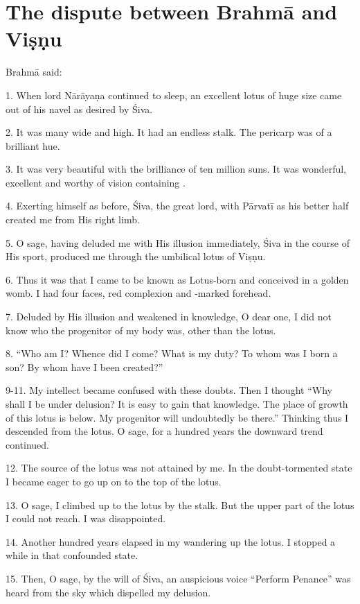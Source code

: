 \chapter{The dispute between Brahmā and Viṣṇu}

Brahmā said:

1. When lord Nārāyaṇa continued to sleep, an excellent lotus of huge size came
out of his navel as desired by Śiva.

2. It was many  wide and high. It had an endless stalk. The pericarp
was of a brilliant hue.

3. It was very beautiful with the brilliance of ten million suns. It was
wonderful, excellent and worthy of vision containing .

4. Exerting himself as before, Śiva, the great lord, with Pārvatī as his better
half created me from His right limb.

5. O sage, having deluded me with His illusion immediately, Śiva in the course
of His sport, produced me through the umbilical lotus of Viṣṇu.

6. Thus it was that I came to be known as Lotus-born and conceived in a golden
womb. I had four faces, red complexion and -marked forehead.

7. Deluded by His illusion and weakened in knowledge, O dear one, I did not know
who the progenitor of my body was, other than the lotus.

8. “Who am I? Whence did I come? What is my duty? To whom was I born a son? By
whom have I been created?”

9-11. My intellect became confused with these doubts. Then I thought “Why shall
I be under delusion? It is easy to gain that knowledge. The place of growth of
this lotus is below. My progenitor will undoubtedly be there.” Thinking thus I
descended from the lotus. O sage, for a hundred years the downward trend
continued.

12. The source of the lotus was not attained by me. In the doubt-tormented state
I became eager to go up on to the top of the lotus.

13. O sage, I climbed up to the lotus by the stalk. But the upper part of
the lotus I could not reach. I was disappointed.

14. Another hundred years elapsed in my wandering up the lotus. I stopped
a while in that confounded state.

15. Then, O sage, by the will of Śiva, an auspicious voice “Perform Penance” was
heard from the sky which dispelled my delusion.

